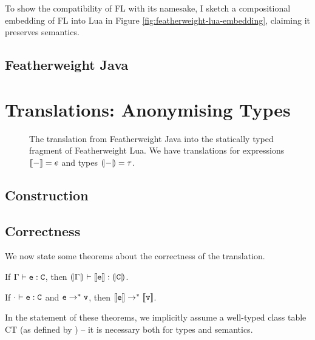 To show the compatibility of FL with its namesake, I sketch a compositional embedding of FL into Lua in Figure \ref{fig:featherweight-lua-embedding}, claiming it preserves semantics.

\subsection{Featherweight Java}
\label{subsec:featherweight-java}


\section{Translations: Anonymising Types}
\label{sec:translations}


\begin{figure}
    \centering
    
    \caption{The translation from Featherweight Java into the statically typed fragment of Featherweight Lua. We have translations for expressions $\denot{-} = e$ and types $\denoty{-} = \tau$.}
    \label{fig:translation}
\end{figure}

\subsection{Construction}


\subsection{Correctness}

We now state some theorems about the correctness of the translation.

\begin{theorem}
    If $\Gamma \vdash \texttt{e} : \texttt{C}$, then $\denoty{\Gamma} \vdash \denot{\fj e} : \denoty{\fj C}$. 
\end{theorem}

\begin{theorem}
    If $\cdot \vdash \texttt{e} : \texttt{C}$ and $\texttt{e} \rightarrow^* \texttt{v}$, then $\denot{\fj e} \rightarrow^* \denot{\fj v}$.
\end{theorem}

In the statement of these theorems, we implicitly assume a well-typed class table $\mathrm{CT}$ (as defined by \textcite{featherweight-java}) -- it is necessary both for types and semantics.

